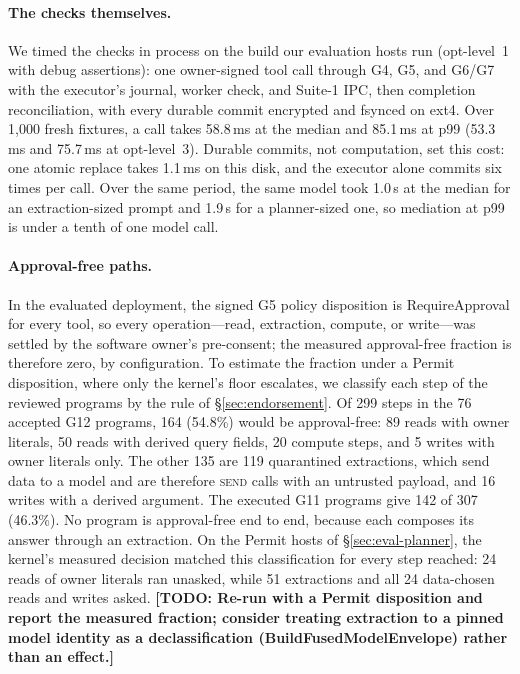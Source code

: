 \documentclass[letterpaper,twocolumn,10pt]{article}
\newcommand{\todo}[1]{{\color{red}\textbf{[TODO: #1]}}}
\newcommand{\SEND}{\textsc{send}}
\begin{document}
\paragraph{The checks themselves.} We timed the checks in process on the
build our evaluation hosts run (opt-level~1 with debug assertions): one
owner-signed tool call through G4, G5, and G6/G7 with the executor's
journal, worker check, and Suite-1 IPC, then completion reconciliation,
with every durable commit encrypted and fsynced on ext4. Over 1{,}000
fresh fixtures, a call takes 58.8\,ms at the median and 85.1\,ms at p99
(53.3\,ms and 75.7\,ms at opt-level~3). Durable commits, not computation,
set this cost: one atomic replace takes 1.1\,ms on this disk, and the
executor alone commits six times per call. Over the same period, the same
model took 1.0\,s at the median for an extraction-sized prompt and 1.9\,s
for a planner-sized one, so mediation at p99 is under a tenth of one model
call.

\paragraph{Approval-free paths.} In the evaluated deployment, the signed
G5 policy disposition is \textsf{RequireApproval} for every tool, so every
operation---read, extraction, compute, or write---was settled by the
software owner's pre-consent; the measured approval-free fraction is
therefore zero, by configuration. To estimate the fraction under a
\textsf{Permit} disposition, where only the kernel's floor escalates, we
classify each step of the reviewed programs by the rule of
\S\ref{sec:endorsement}. Of 299 steps in the 76 accepted G12 programs, 164
(54.8\%) would be approval-free: 89 reads with owner literals, 50 reads
with derived query fields, 20 compute steps, and 5 writes with owner
literals only. The other 135 are 119 quarantined extractions, which send
data to a model and are therefore \SEND{} calls with an untrusted payload,
and 16 writes with a derived argument. The executed G11 programs give
142 of 307 (46.3\%). No program is approval-free end to end, because each
composes its answer through an extraction. On the \textsf{Permit} hosts of
\S\ref{sec:eval-planner}, the kernel's measured decision matched this
classification for every step reached: 24 reads of owner literals ran
unasked, while 51 extractions and all 24 data-chosen reads and writes
asked. \todo{Re-run with a
\textsf{Permit} disposition and report the measured fraction; consider
treating extraction to a pinned model identity as a declassification
(\textsf{BuildFusedModelEnvelope}) rather than an effect.}
\end{document}
